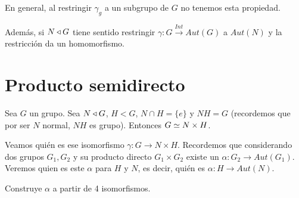 En general, al restringir $\gamma_g$ a un subgrupo de $G$ no tenemos esta propiedad.

Además, si $N \mathbin{\triangleleft} G$ tiene sentido restringir $\gamma: G \xrightarrow{Int} Aut(G)$ a $Aut(N)$ y la restricción da un homomorfismo.

\section{Producto semidirecto}

Sea $G$ un grupo. Sea $N \mathbin{\triangleleft} G$, $H < G$, $N \cap H = \{e\}$ y $NH = G$ (recordemos que por ser $N$ normal, $NH$ es grupo). Entonces $G \simeq N \times H$.

Veamos quién es ese isomorfismo $\gamma : G \to N \times H$. Recordemos que considerando dos grupos $G_1, G_2$ y su producto directo $G_1 \times G_2$ existe un $\alpha : G_2 \to Aut(G_1)$. Veremos quien es este $\alpha$ para $H$ y $N$, es decir, quién es $\alpha: H \to Aut(N)$.

Construye $\alpha$ a partir de 4 isomorfismos.

